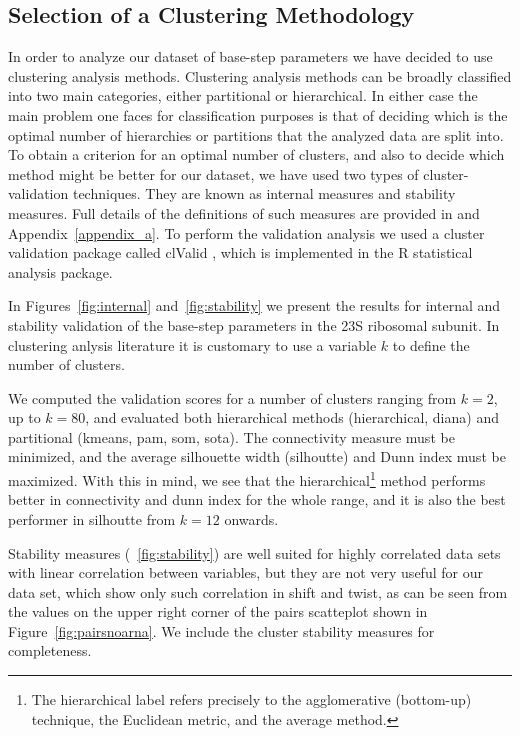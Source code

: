 \subsection{Selection of a Clustering Methodology} 
In  order to  analyze  our  dataset of  base-step  parameters we  have
decided  to  use  clustering  analysis methods.   Clustering  analysis
methods  can be broadly  classified into  two main  categories, either
partitional  or hierarchical.   In either  case the  main  problem one
faces for  classification purposes  is that of  deciding which  is the
optimal number of hierarchies or partitions that the analyzed data are
split into.  To obtain a  criterion for an optimal number of clusters,
and also  to decide which method  might be better for  our dataset, we
have used two types  of cluster-validation techniques.  They are known
as  internal measures  and stability  measures.  Full  details  of the
definitions  of   such  measures  are   provided  in  \cite{handl2005,
brock2008} and  Appendix~\ref{appendix_a}.  To perform  the validation
analysis  we   used  a  cluster  validation   package  called  clValid
\cite{brock2008},   which  is  implemented   in  the   R  \cite{rcite}
statistical analysis package.

In  Figures~\ref{fig:internal} and~\ref{fig:stability} we  present the
results  for  internal  and  stability  validation  of  the  base-step
parameters  in  the  23S  ribosomal  subunit.  In  clustering  anlysis
literature it is customary to use  a variable $k$ to define the number
of clusters.

We computed  the validation  scores for a  number of  clusters ranging
from  $k=2$, up  to $k=80$,  and evaluated  both  hierarchical methods
(hierarchical, diana)  and partitional (kmeans, pam,  som, sota).  The
connectivity  measure must  be minimized,  and the  average silhouette
width  (silhoutte) and  Dunn index  must be  maximized.  With  this in
mind,  we see  that the  hierarchical\footnote{The  hierarchical label
  refers  precisely to  the agglomerative  (bottom-up)  technique, the
  Euclidean metric, and the average method.} method performs better in
connectivity and  dunn index for the  whole range, and it  is also the
best performer in silhoutte from $k=12$ onwards.

Stability measures  (~\ref{fig:stability}) are well  suited for highly
correlated data sets with linear correlation between variables, but
they are not very useful for our data set,
which show  only such correlation in  shift and twist, as  can be seen
from  the values on  the upper  right corner  of the  pairs scatteplot
shown  in   Figure~\ref{fig:pairsnoarna}.   We  include   the  cluster
stability measures for completeness.

